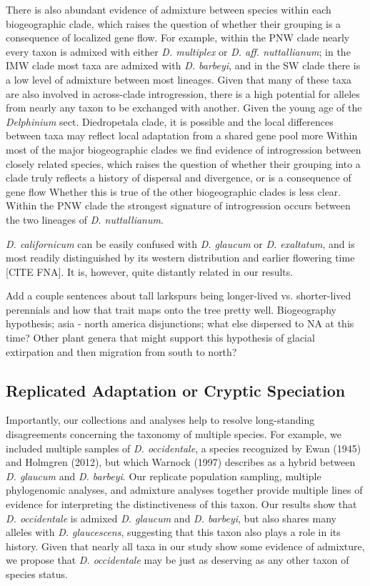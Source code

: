 \documentclass[11pt]{article}
\begin{document}
There is also abundant evidence of admixture between species within each 
biogeographic clade, which raises the question of whether their grouping 
is a consequence of localized gene flow.
% 
For example, within the PNW clade nearly every taxon is admixed
with either \emph{D. multiplex} or \emph{D. aff. nuttallianum}; 
in the IMW clade most taxa are admixed with \emph{D. barbeyi}, and in the 
SW clade there is a low level of admixture between most lineages. 
Given that many of these taxa are also involved in across-clade introgression, 
there is a high potential for alleles from nearly any taxon to be exchanged
with another.
% 
Given the young age of the \emph{Delphinium} sect. Diedropetala clade, it 
is possible and the local differences between taxa may reflect local 
adaptation from a shared gene pool more 
% 
Within most of the major biogeographic clades we find evidence of introgression
between closely related species, which raises the question of whether their 
grouping into a clade truly reflects a history of dispersal and divergence, or
is a consequence of gene flow 
% 
Whether this is true of the other biogeographic clades is less clear. 
% 
Within the PNW clade the strongest signature of introgression occurs between the
two lineages of \emph{D. nuttallianum}. 



\emph{D. californicum} can be easily confused with \emph{D. glaucum} or \emph{D. exaltatum}, and
is most readily distinguished by its western distribution and earlier flowering time [CITE FNA]. 
It is, however, quite distantly related in our results.

Add a couple sentences about tall larkspurs being longer-lived vs. shorter-lived perennials and how that trait maps onto the tree pretty well.
Biogeography hypothesis; asia - north america disjunctions; what else dispersed to NA at this time? Other plant genera that might support this hypothesis of glacial extirpation and then migration from south to north?


\subsection{Replicated Adaptation or Cryptic Speciation}
Importantly, our collections and analyses help to resolve long-standing disagreements 
concerning the taxonomy of multiple species. For example, we included multiple samples
of \emph{D. occidentale}, a species recognized by Ewan (1945) and Holmgren (2012), 
but which Warnock (1997) describes as a hybrid between \emph{D. glaucum} and 
\emph{D. barbeyi}. 
% 
Our replicate population sampling, multiple phylogenomic analyses, and admixture 
analyses together provide multiple lines of evidence for interpreting the distinctiveness
of this taxon. Our results show that \emph{D. occidentale} is admixed \emph{D. glaucum} 
and \emph{D. barbeyi}, but also shares many alleles with \emph{D. glaucescens}, suggesting
that this taxon also plays a role in its history. Given that nearly all taxa in our 
study show some evidence of admixture, we propose that \emph{D. occidentale} 
may be just as deserving as any other taxon of species status.
\end{document}
